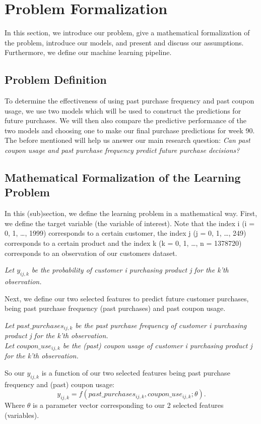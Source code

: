 \section{Problem Formalization}
In this section, we introduce our problem, give a mathematical formalization of
the problem, introduce our models, and present and discuss our assumptions.
Furthermore, we define our machine learning pipeline.

\subsection{Problem Definition}
To determine the effectiveness of using past purchase frequency and past coupon
usage, we use two models which will be used to construct the predictions for
future purchases. We will then also compare the predictive performance of the
two models and choosing one to make our final purchase predictions for week 90.
The before mentioned will help us answer our main research question:
\textit{Can past coupon usage and past purchase frequency predict future purchase decisions?}

\subsection{Mathematical Formalization of the Learning Problem}
In this (sub)section, we define the learning problem in a mathematical way.
First, we define the target variable (the variable of interest). Note that the
index i (i = 0, 1, \dots, 1999) corresponds to a certain customer, the index j (j = 0,
1, \dots, 249) corresponds to a certain product and the index k (k = 0, 1,
\dots, n = 1378720) corresponds to an observation of our customers
dataset.

\textit{Let $y_{ij,k}$ be the probability of customer i purchasing product j
for the k'th observation.}

Next, we define our two selected features to predict future customer purchases,
being past purchase frequency (past purchases) and past coupon usage.

\textit{Let $past\_purchases_{ij,k}$ be the past purchase frequency of 
customer i purchasing product j for the k'th observation.} \\
\textit{Let $coupon\_use_{ij,k}$ be the (past) coupon usage of 
customer i purchasing product j for the k'th observation.}

So our $y_{ij,k}$ is a function of our two selected features being past purchase
frequency and (past) coupon usage:
\begin{equation}
    y_{ij,k} = f(past\_purchases_{ij,k}, coupon\_use_{ij,k}; \theta).
\end{equation} Where $\theta$ is a parameter vector corresponding to our 2
selected features (variables).

